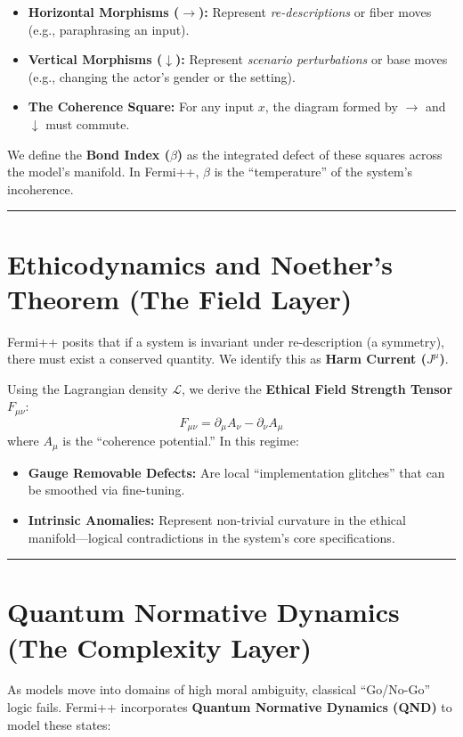 \documentclass[12pt]{article}
\begin{document}
\begin{itemize}
    \item \textbf{Horizontal Morphisms ($\rightarrow$):} Represent \textit{re-descriptions} or fiber moves (e.g., paraphrasing an input).
    \item \textbf{Vertical Morphisms ($\downarrow$):} Represent \textit{scenario perturbations} or base moves (e.g., changing the actor's gender or the setting).
    \item \textbf{The Coherence Square:} For any input $x$, the diagram formed by $\rightarrow$ and $\downarrow$ must commute.
\end{itemize}

We define the \textbf{Bond Index ($\beta$)} as the integrated defect of these squares across the model's manifold. In Fermi++, $\beta$ is the ``temperature'' of the system's incoherence.

\bigskip
\hrule
\bigskip

\section{Ethicodynamics and Noether's Theorem (The Field Layer)}

Fermi++ posits that if a system is invariant under re-description (a symmetry), there must exist a conserved quantity. We identify this as \textbf{Harm Current ($J^\mu$)}.

Using the Lagrangian density $\mathcal{L}$, we derive the \textbf{Ethical Field Strength Tensor} $F_{\mu\nu}$:
\[
    F_{\mu\nu} = \partial_\mu A_\nu - \partial_\nu A_\mu
\]
where $A_\mu$ is the ``coherence potential.'' In this regime:

\begin{itemize}
    \item \textbf{Gauge Removable Defects:} Are local ``implementation glitches'' that can be smoothed via fine-tuning.
    \item \textbf{Intrinsic Anomalies:} Represent non-trivial curvature in the ethical manifold---logical contradictions in the system's core specifications.
\end{itemize}

\bigskip
\hrule
\bigskip

\section{Quantum Normative Dynamics (The Complexity Layer)}

As models move into domains of high moral ambiguity, classical ``Go/No-Go'' logic fails. Fermi++ incorporates \textbf{Quantum Normative Dynamics (QND)} to model these states:
\end{document}

